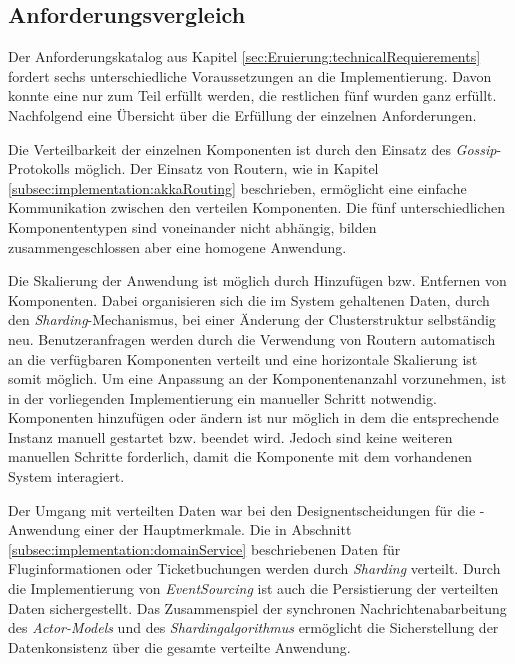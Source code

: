 \subsection{Anforderungsvergleich}
Der Anforderungskatalog aus Kapitel \ref{sec:Eruierung:technicalRequierements} fordert sechs unterschiedliche Voraussetzungen an die Implementierung. Davon konnte eine nur zum Teil erfüllt werden, die restlichen fünf wurden ganz erfüllt. \\
Nachfolgend eine Übersicht über die Erfüllung der einzelnen Anforderungen.
\begin{enumerate}
  Die Verteilbarkeit der einzelnen Komponenten ist durch den Einsatz des \textit{Gossip}-Protokolls möglich. Der Einsatz von Routern, wie in Kapitel \ref{subsec:implementation:akkaRouting} beschrieben, ermöglicht eine einfache Kommunikation zwischen den verteilen Komponenten. Die fünf unterschiedlichen Komponententypen sind voneinander nicht abhängig, bilden zusammengeschlossen aber eine homogene Anwendung.

  Die Skalierung der Anwendung ist möglich durch Hinzufügen bzw. Entfernen von Komponenten. Dabei organisieren sich die im System gehaltenen Daten, durch den \textit{Sharding}-Mechanismus, bei einer Änderung der Clusterstruktur selbständig neu. Benutzeranfragen werden durch die Verwendung von Routern automatisch an die verfügbaren Komponenten verteilt und eine horizontale Skalierung ist somit möglich. Um eine Anpassung an der Komponentenanzahl vorzunehmen, ist in der vorliegenden Implementierung ein manueller Schritt notwendig. Komponenten hinzufügen oder ändern ist nur möglich in dem die entsprechende Instanz manuell gestartet bzw. beendet wird. Jedoch sind keine weiteren manuellen Schritte forderlich, damit die Komponente mit dem vorhandenen System interagiert. 

  Der Umgang mit verteilten Daten war bei den Designentscheidungen für die -Anwendung einer der Hauptmerkmale. Die in Abschnitt \ref{subsec:implementation:domainService} beschriebenen Daten für Fluginformationen oder Ticketbuchungen werden durch \textit{Sharding} verteilt. Durch die Implementierung von \textit{EventSourcing} ist auch die Persistierung der verteilten Daten sichergestellt. Das Zusammenspiel der synchronen Nachrichtenabarbeitung des \textit{Actor-Models} und des \textit{Shardingalgorithmus} ermöglicht die Sicherstellung der Datenkonsistenz über die gesamte verteilte Anwendung.
  

\end{enumerate}
